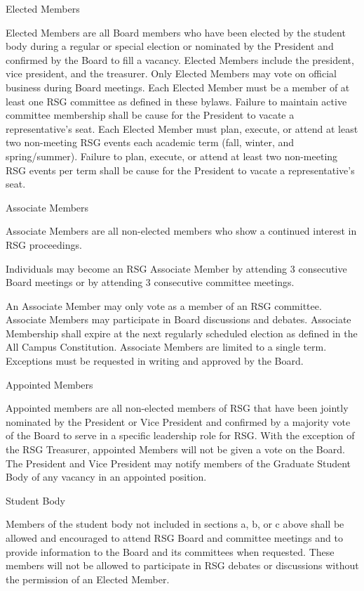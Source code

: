 \begin{enumsubsection}
\itemnotoc Elected Members 
\begin{enumsubsubsection}
\itemnotoc Elected Members are all Board members who have been elected by the 
student body during a regular or special election or nominated by the 
President and confirmed by the Board to fill a vacancy. 
\itemnotoc Elected Members include the president, vice president, and the treasurer. 
\itemnotoc Only Elected Members may vote on official business during Board 
meetings.
\itemnotoc Each Elected Member must be a member of at least one RSG committee as defined in these bylaws. Failure to maintain active committee membership shall be cause for the President to vacate a representative's seat. 
\itemnotoc Each Elected Member must plan, execute, or attend at least two non-meeting RSG events each academic term (fall, winter, and 
spring/summer). Failure to plan, execute, or attend at least two non-meeting RSG events per term shall be cause for the President to vacate a 
representative's seat.

\end{enumsubsubsection}
\itemnotoc Associate Members
\begin{enumsubsubsection}
\itemnotoc Associate Members are all non-elected members who show a continued 
interest in RSG proceedings. 
\begin{enumerate}
\itemnotoc Individuals may become an RSG Associate Member by attending 3 
consecutive Board meetings or by attending 3 consecutive committee meetings. 
\end{enumerate}
\itemnotoc An Associate Member may only vote as a member of an RSG committee. 
\itemnotoc Associate Members may participate in Board discussions and debates. 
\itemnotoc Associate Membership shall expire at the next regularly scheduled 
election as defined in the All Campus Constitution. 
\itemnotoc Associate Members are limited to a single term. Exceptions must be 
requested in writing and approved by the Board. 
\end{enumsubsubsection}
\itemnotoc Appointed Members
\begin{enumsubsection}
\itemnotoc Appointed members are all non-elected members of RSG that have been 
jointly nominated by the President or Vice President and confirmed by a 
majority vote of the Board to serve in a specific leadership role for RSG. 
\itemnotoc With the exception of the RSG Treasurer, appointed Members will not be 
given a vote on the Board. 
\itemnotoc The President and Vice President may notify members of the Graduate 
Student Body of any vacancy in an appointed position. 
\end{enumsubsection}
\itemnotoc Student Body
\begin{enumsubsubsection}
\itemnotoc Members of the student body not included in sections a, b, or c above 
shall be allowed and encouraged to attend RSG Board and committee 
meetings and to provide information to the Board and its committees 
when requested. These members will not be allowed to participate in 
RSG debates or discussions without the permission of an Elected 
Member. 



\end{enumsubsubsection}
\end{enumsubsection}
